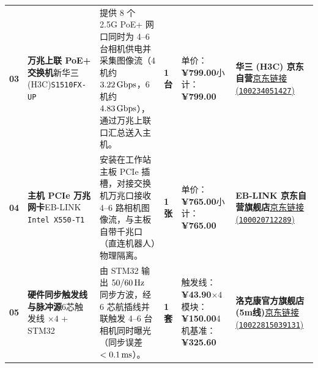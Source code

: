 \documentclass[10pt, a4paper]{ctexart}
\begin{document}
\begin{table}[H]
\begin{tabularx}{\textwidth}{@{} C{0.65cm} L{2.60cm} Y C{1.05cm} L{2.60cm} L{3.60cm} @{}}
\textbf{03} & \textbf{万兆上联 PoE+ 交换机}\newline 新华三 (H3C)\newline \texttt{S1510FX-UP} & 提供 8 个 2.5G PoE+ 网口同时为 4--6 台相机供电并采集图像流（4 机约 $3.22\text{\,Gbps}$，6 机约 $4.83\text{\,Gbps}$），通过万兆上联口汇总送入主机。 & \textbf{1 台} & 单价：\textbf{¥799.00}\newline 小计：\textbf{¥799.00} & \textbf{华三 (H3C) 京东自营}\newline \href{https://item.jd.com/100234051427.html}{京东链接 (\texttt{100234051427})} \\
\textbf{04} & \textbf{主机 PCIe 万兆网卡}\newline EB-LINK \texttt{Intel X550-T1} & 安装在工作站主板 PCIe 插槽，对接交换机万兆口接收 4--6 路相机图像流，与主板自带千兆口（直连机器人）物理隔离。 & \textbf{1 张} & 单价：\textbf{¥765.00}\newline 小计：\textbf{¥765.00} & \textbf{EB-LINK 京东自营旗舰店}\newline \href{https://item.jd.com/100020712289.html}{京东链接 (\texttt{100020712289})} \\
\textbf{05} & \textbf{硬件同步触发线与脉冲源}\newline 6芯触发线 $\times 4$ + STM32 & 由 STM32 输出 $50/60\text{\,Hz}$ 同步方波，经 6 芯航插线并联触发 4--6 台相机同时曝光（同步误差 $<0.1\text{\,ms}$）。 & \textbf{1 套} & 触发线：\textbf{¥43.90}$\times 4$\newline 模块：\textbf{¥150.00}\newline 4机基准：\textbf{¥325.60} & \textbf{洛克康官方旗舰店 (5m线)}\newline \href{https://item.jd.com/10022815039131.html}{京东链接 (\texttt{10022815039131})} \\

\end{tabularx}
\end{table}
\end{document}
